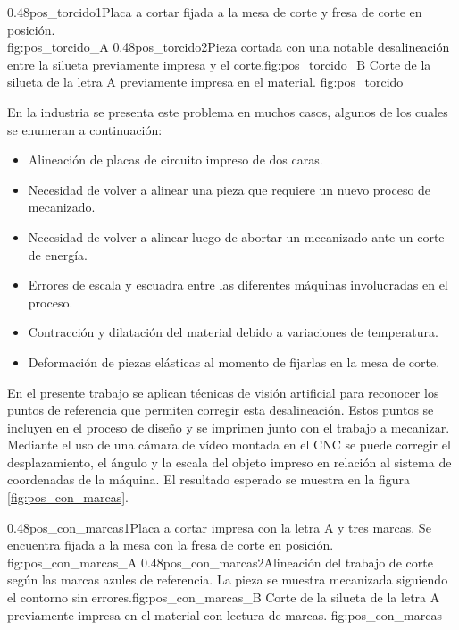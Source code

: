 \subfigab
         {0.48}{pos_torcido1}{Placa a cortar fijada a la mesa de corte y fresa de corte en posición.\\ \vphantom{1}}{fig:pos_torcido_A}
         {0.48}{pos_torcido2}{Pieza cortada con una notable desalineación entre la silueta previamente impresa y el corte.}{fig:pos_torcido_B}
         {Corte de la silueta de la letra A previamente impresa en el material.}
         {fig:pos_torcido}

         En la industria se presenta este problema en muchos casos, algunos de los cuales se enumeran a continuación:
\begin{itemize}
   \item{Alineación de placas de circuito impreso de dos caras.}
   \item{Necesidad de volver a alinear una pieza que requiere un nuevo proceso de mecanizado.}
   \item{Necesidad de volver a alinear luego de abortar un mecanizado ante un corte de energía.}
   \item{Errores de escala y escuadra entre las diferentes máquinas involucradas en el proceso.}
   \item{Contracción y dilatación del material debido a variaciones de temperatura.}
   \item{Deformación de piezas elásticas al momento de fijarlas en la mesa de corte.}
\end{itemize}

         En el presente trabajo se aplican técnicas de visión artificial para reconocer los puntos de referencia que permiten corregir esta desalineación.
         Estos puntos se incluyen en el proceso de diseño y se imprimen junto con el trabajo a mecanizar.
         Mediante el uso de una cámara de vídeo montada en el CNC se puede corregir el desplazamiento, el ángulo y la escala del objeto impreso en relación al sistema de coordenadas de la máquina.
         El resultado esperado se muestra en la figura \ref{fig:pos_con_marcas}.

\subfigab
         {0.48}{pos_con_marcas1}{Placa a cortar impresa con la letra A y tres marcas. Se encuentra fijada a la mesa con la fresa de corte en posición.\\ \vphantom{10}}{fig:pos_con_marcas_A}
         {0.48}{pos_con_marcas2}{Alineación del trabajo de corte según las marcas azules de referencia. La pieza se muestra mecanizada siguiendo el contorno sin errores.}{fig:pos_con_marcas_B}
         {Corte de la silueta de la letra A previamente impresa en el material con lectura de marcas. }
         {fig:pos_con_marcas}


